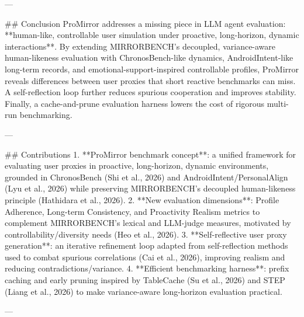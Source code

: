 ---

## Conclusion  
ProMirror addresses a missing piece in LLM agent evaluation: **human-like, controllable user simulation under proactive, long-horizon, dynamic interactions**. By extending MIRRORBENCH’s decoupled, variance-aware human-likeness evaluation with ChronosBench-like dynamics, AndroidIntent-like long-term records, and emotional-support-inspired controllable profiles, ProMirror reveals differences between user proxies that short reactive benchmarks can miss. A self-reflection loop further reduces spurious cooperation and improves stability. Finally, a cache-and-prune evaluation harness lowers the cost of rigorous multi-run benchmarking.

---

## Contributions  
1. **ProMirror benchmark concept**: a unified framework for evaluating user proxies in proactive, long-horizon, dynamic environments, grounded in ChronosBench (Shi et al., 2026) and AndroidIntent/PersonalAlign (Lyu et al., 2026) while preserving MIRRORBENCH’s decoupled human-likeness principle (Hathidara et al., 2026).  
2. **New evaluation dimensions**: Profile Adherence, Long-term Consistency, and Proactivity Realism metrics to complement MIRRORBENCH’s lexical and LLM-judge measures, motivated by controllability/diversity needs (Heo et al., 2026).  
3. **Self-reflective user proxy generation**: an iterative refinement loop adapted from self-reflection methods used to combat spurious correlations (Cai et al., 2026), improving realism and reducing contradictions/variance.  
4. **Efficient benchmarking harness**: prefix caching and early pruning inspired by TableCache (Su et al., 2026) and STEP (Liang et al., 2026) to make variance-aware long-horizon evaluation practical.

---